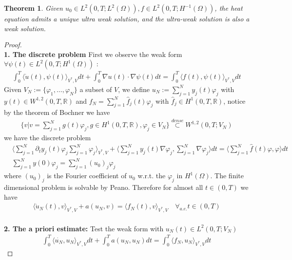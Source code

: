 \documentclass[a4paper,12pt,oneside,fleqn]{book}
\newtheorem{theorem}{Theorem}[section]
\theoremstyle{definition}
\theoremstyle{remark}
\begin{document}
\begin{theorem}
Given $u_0 \in L^2(0, T; L^2(\Omega)), f \in L^2(0, T; H^{-1}(\Omega))$, the heat equation admits a unique ultra weak solution, and the ultra-weak solution is also a weak solution.
\end{theorem}
\begin{proof}
\quad\\
\textbf{1. The discrete problem}
First we observe the weak form $\forall \psi(t) \in L^2(0, T; H^1(\Omega))$ :
\begin{align*}
	\int_0^T \langle \dot{u}(t), \psi(t) \rangle_{V^*, V} dt + \int_0^T \nabla u(t) \cdot \nabla \psi(t) dt = \int_0^T \langle f(t), \psi(t) \rangle_{V^*, V} dt 
\end{align*}
Given $V_N := \{\varphi_1, \dots, \varphi_N\}$ a subset of $V$, we define $u_N := \sum_{j = 1}^N y_j(t)\varphi_j$ with $y(t) \in W^{1, 2}(0, T, \mathbb{R})$ and $f_N = \sum_{j = 1}^N \hat{f}_j(t) \varphi_j$ with $\hat{f}_j \in H^1(0, T, \mathbb{R})$, notice by the theorem of Bochner we have
\begin{align*}
	\bigg\{ v | v = \sum_{j = 1}^N g(t) \varphi_j, g \in H^1(0, T, \mathbb{R}), \varphi_j \in V_N \bigg\} \overset{dense}{\subset} W^{1, 2}(0, T; V_N)
\end{align*}
we have the discrete problem
\begin{align*}
	& \langle \sum_{j = 1}^N \partial_t y_j(t) \varphi_j \sum_{j = 1}^N \varphi_j \rangle_{V^*, V} + \langle \sum_{j = 1}^N y_j(t) \nabla \varphi_j, \sum_{j = 1}^N \nabla \varphi_j \rangle dt = \langle \sum_{j = 1}^N \hat{f}(t) \varphi, \varphi \rangle dt \\
	&\sum_{j = 1}^N y(0) \varphi_j = \sum_{j = 1}^N (u_0)_j \varphi_j
\end{align*}
where $(u_0)_j$ is the Fourier coefficient of $u_0$ w.r.t. the $\varphi_j$ in $H^1(\Omega)$. The finite dimensional problem is solvable by Peano. Therefore for almost all $t \in (0, T)$ we have
\begin{align*}
	\langle \dot{u}_N(t), v \rangle_{V^*, V} + a(u_N, v ) = \langle f_N(t), v \rangle_{V^*, V} \quad \forall_{a.e.} t \in (0, T)
\end{align*}
\quad\\
\textbf{2. The a priori estimate:}
Test the weak form with $u_N(t) \in L^2(0, T; V_N)$
\begin{align*}
	\int_0^T \langle \dot{u_N}, u_N \rangle_{V^*, V} dt + \int_0^T a (u_N, u_N) dt = \int_0^T \langle f_N, u_N \rangle_{V^*, V} dt
\end{align*}

\end{proof}
\end{document}
